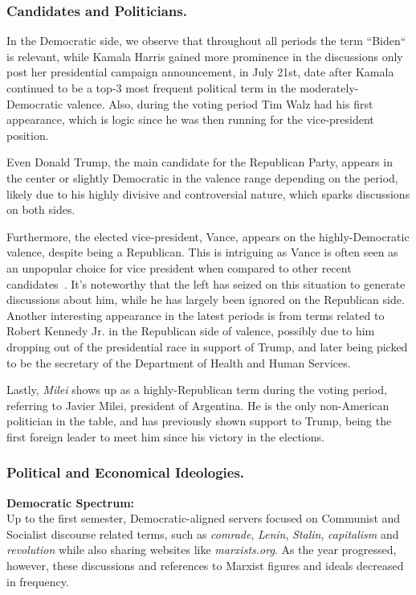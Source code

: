 \subsubsection{Candidates and Politicians.\\}
\label{sec:politicians} 

In the Democratic side, we observe that throughout all periods the term ``Biden`` is relevant, while Kamala Harris gained more prominence in the discussions only post her presidential campaign announcement, in July 21st, date after Kamala continued to be a top-3 most frequent political term in the moderately-Democratic valence. Also, during the voting period Tim Walz had his first appearance, which is logic since he was then running for the vice-president position.

Even Donald Trump, the main candidate for the Republican Party, appears in the center or slightly Democratic in the valence range depending on the period, likely due to his highly divisive and controversial nature, which sparks discussions on both sides.

Furthermore, the elected vice-president, Vance, appears on the highly-Democratic valence, despite being a Republican. This is intriguing as Vance is often seen as an unpopular choice for vice president when compared to other recent candidates~\cite{vance2024impopular}. It’s noteworthy that the left has seized on this situation to generate discussions about him, while he has largely been ignored on the Republican side. Another interesting appearance in the latest periods is from terms related to Robert Kennedy Jr. in the Republican side of valence, possibly due to him dropping out of the presidential race in support of Trump, and later being picked to be the secretary of the Department of Health and Human Services. 

Lastly, \textit{Milei} shows up as a highly-Republican term during the voting period, referring to Javier Milei, president of Argentina. He is the only non-American politician in the table, and has previously shown support to Trump, being the first foreign leader to meet him since his victory in the elections.

\subsubsection{Political and Economical Ideologies. \\}
\label{sec:ideologies}

\textbf{Democratic Spectrum:\\} Up to the first semester, Democratic-aligned servers focused on Communist and Socialist discourse related terms, such as \textit{comrade}, \textit{Lenin}, \textit{Stalin}, \textit{capitalism} and \textit{revolution} while also sharing websites like \textit{marxists.org}. As the year progressed, however, these discussions and references to Marxist figures and ideals decreased in frequency. 

